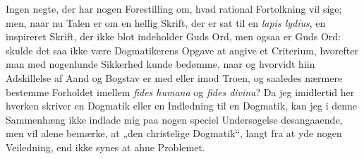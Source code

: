 Ingen negte, der har nogen Forestilling om, hvad rational
Fortolkning vil sige; men, naar nu Talen er om en hellig Skrift,
der er sat til en \textit{lapis lydius}, en inspireret Skrift, der
ikke blot indeholder Guds Ord, men ogsaa er Guds Ord: skulde det
saa ikke være Dogmatikerens Opgave at angive et
Criterium, hvorefter man med nogenlunde Sikkerhed kunde
bedømme, naar og hvorvidt hiin Adskillelse af Aand og Bogstav er
med eller imod Troen, og saaledes nærmere bestemme Forholdet
imellem \textit{fides humana} og \textit{fides divina}? Da jeg
imidlertid her hverken skriver en Dogmatik eller en Indledning til
en Dogmatik, kan jeg i denne Sammenhæng ikke indlade mig paa nogen
speciel Undersøgelse desangaaende, men vil alene bemærke, at „den
christelige Dogmatik“, langt fra at yde nogen Veiledning, end ikke
synes at ahne Problemet.

